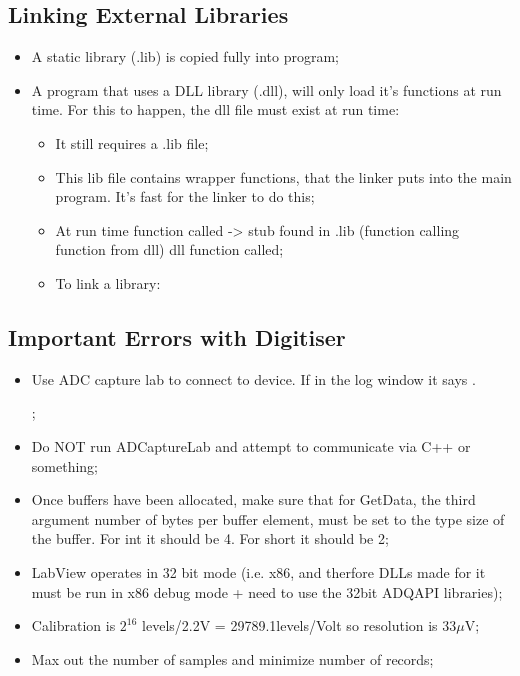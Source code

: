  \subsection{Linking External Libraries}
 \begin{itemize}
	\item A static library (.lib) is copied fully into program;
	\item A program that uses a DLL library (.dll), will only load it's functions at run time. For this to happen, the dll file must exist at run time:
	\begin{itemize}
		\item It still requires a .lib file;
		\item This lib file contains wrapper functions, that the linker puts into the main program. It's fast for the linker to do this;
		\item At run time function called -> stub found in .lib (function calling function from dll) \ra dll function called;
		\item To link a library:
	\end{itemize}
 \end{itemize}

 \subsection{Important Errors with Digitiser}
  \begin{itemize}
  	\item Use ADC capture lab to connect to device. If in the log window it says .
  	
  	;
  	\item Do NOT run ADCaptureLab and attempt to communicate via C++ or something;
  	\item Once buffers have been allocated, make sure that for GetData, the third argument number of bytes per buffer element, must be set to the type size of the buffer. For int it should be 4. For short it should be 2;
  	\item LabView operates in 32 bit mode (i.e. x86, and therfore DLLs made for it must be run in x86 debug mode + need to use the 32bit ADQAPI libraries);
  	\item Calibration is $ 2^{16} $ levels/2.2V = 29789.1levels/Volt so resolution is 33$ \mu $V;
	\item Max out the number of samples and minimize number of records;
  \end{itemize}

